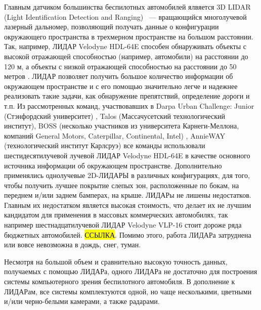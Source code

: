 Главным датчиком большинства беспилотных автомобилей ялвяется 3D LIDAR (Light Identification Detection and
Ranging) ~--- вращающийся многолучевой лазерный дальномер, позволяющий получать данные о конфигурации окружающего
пространства в трехмерном пространстве на большом расстоянии. Так, например, ЛИДАР Velodyne HDL-64E способен
обнаруживать объекты с высокой отражающей способностью (например, автомобили) на расстоянии до 120 м, а объекты
с низкой отражающей способностью на расстоянии до 50 метров \cite{sensor_hdl64_manual}.  ЛИДАР позволяет получить большое
количество информации об окружающем пространстве и с его помощью значительно легче и надежнее реализовать такие задачи,
как обнаружение препятствий, определение дороги и т.п.  Из рассмотренных команд, участвовавших в Darpa Urban Challenge:
Junior (Стэнфордский университет) \cite{darpa_junior}, Talos (Массачусетский технологический институт)\cite{darpa_mit},
BOSS (несколько участников из университета Карнеги-Меллона, компаний General Motors,  Caterpillar, Continental, Intel)
\cite{darpa_boss}, AnnieWAY (технологический институт Карлсруэ) \cite{darpa_annieway} все команды использовали
шестидесятилучевой лучевой ЛИДАР Velodyne HDL-64E в качестве основного источника информации об окружающем пространстве.
Дополнительно применялись однолучевые 2D-ЛИДАРЫ в различных конфигурациях, для того, чтобы получить лучшее
покрытие слепых зон, расположенные по бокам, на переднем и/или заднем бамперах, на крыше. ЛИДАРы не лишены
недостатков. Главным их недостатком является высокая стоимость, что делает их не лучшим кандидатом для применения
в массовых коммерческих автомобилях, так например шестнадцатилучевой ЛИДАР Velodyne VLP-16 стоит дороже ряда
бюджетных автомобилей. \hl{ССЫЛКА}. Помимо этого, работа ЛИДАРа затруднена или вовсе невозможна в  дождь, снег,
туман.

Несмотря на большой объем и сравнительно высокую точность данных, получаемых с помощью ЛИДАРа, одного ЛИДАРа не
достаточно для построения системы компьютерного зрения беспилотного автомобиля. В дополнение к ЛИДАРам, все
системы комплектуются одной, но чаще несколькими, цветными и/или черно-белыми камерами, а также радарами.

